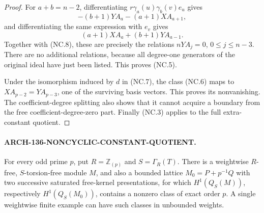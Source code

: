 \begin{proof}
For \(a+b=n-2\), differentiating
\(r\gamma_a(u)\gamma_b(v)e_u\) gives
\[
                   -(b+1)YA_a-(a+1)XA_{a+1},
\]
and differentiating the same expression with \(e_v\) gives
\[
                    (a+1)XA_a+(b+1)YA_{a-1}.
\]
Together with (NC.8), these are precisely the relations
\(nYA_j=0\), \(0\leq j\leq n-3\).  There are no additional
relations, because all degree-one generators of the original
ideal have just been listed.  This proves (NC.5).

Under the isomorphism induced by \(d\) in (NC.7), the class
(NC.6) maps to
\(XA_{p-2}=YA_{p-3}\), one of the surviving basis vectors.
This proves its nonvanishing.  The coefficient-degree splitting
also shows that it cannot acquire a boundary from the free
coefficient-degree-zero part.  Finally (NC.3) applies to the
full extra-constant quotient.
\end{proof}

\paragraph{ARCH-136-NONCYCLIC-CONSTANT-QUOTIENT.}
For every odd prime \(p\), put \(R=\mathbb Z_{(p)}\) and
\(S=\Gamma_R(T)\).  There is a weightwise \(R\)-free,
\(S\)-torsion-free module \(M\), and also a bounded lattice
\(M_0=P+p^{-1}Q\) with two successive saturated free-kernel
presentations, for which \(H^1(Q_S(M))\), respectively
\(H^1(Q_S(M_0))\), contains a nonzero class of exact order
\(p\).  A single weightwise finite example can have such classes
in unbounded weights.


